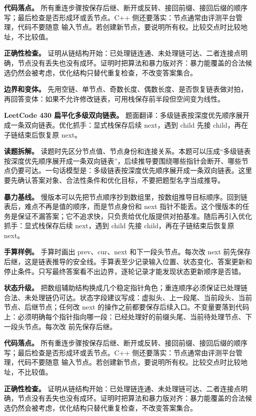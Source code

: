 \textbf{代码落点。} 所有重连步骤按保存后继、断开或反转、接回前缀、接回后缀的顺序写；最后检查是否形成环或丢节点。C++ 侧还要落实：节点通常由评测平台管理，代码不要随意  输入节点。若创建新节点，要说明所有权。比较交点时比较地址，不比较值。

\textbf{正确性检查。} 证明从链结构开始：已处理链连通、未处理链可达、二者连接点明确，节点没有丢失也没有成环。证明时把算法和暴力版对齐：暴力能覆盖的合法候选仍然会被考虑，优化结构只替代重复检查，不改变答案集合。

\textbf{边界和变体。} 先用空链、单节点、奇数长度、偶数长度、是否恢复链表做对拍，再回答变体：如果不允许修改链表，可用栈保存前半段但空间变为线性。

\noindent\textbf{LeetCode 430 扁平化多级双向链表。} 题面翻译：多级链表按深度优先顺序展开成一条双向链表。优化抓手：显式栈保存后续 next，遇到 child 先接 child，再在子链结束后恢复原 next。

\textbf{读题拆解。} 读题时先区分节点值、节点身份和连接关系。本题可以压成“多级链表按深度优先顺序展开成一条双向链表”，后续推导要围绕哪些指针会断开、哪些节点仍要可达。一句话模型是：多级链表按深度优先顺序展开成一条双向链表。这里要先确认答案对象、合法性条件和优化目标，不要把题型名字当成推导。

\textbf{暴力基线。} 慢版本可以先把节点顺序抄到数组里，按数组推导目标顺序。回到链表后，难点不再是值的顺序，而是节点身份和 next 指针不能丢。这个慢版本的任务是保证不漏答案；它不追求快，只负责给优化版提供对拍基准。随后再引入优化抓手：显式栈保存后续 next，遇到 child 先接 child，再在子链结束后恢复原 next。

\textbf{手算样例。} 手算时画出 prev、cur、next 和下一段头节点。每次改 next 前先保存后继，这是链表推导的安全线。手算表至少记录输入位置、状态变化、答案更新和停止条件。只写最终答案看不出边界，逐轮记录才能发现状态更新顺序是否错。

\textbf{状态升级。} 把数组辅助结构换成几个稳定指针角色；重连顺序必须保证已处理链合法、未处理链仍可达。状态字段建议写成：虚拟头、上一段尾、当前段头、当前节点、后继节点；任何改 next 的操作之前都要保存后续入口。不变量要落到代码上：必须明确每个指针指向哪一段：已经处理好的前缀头尾、当前待处理节点、下一段头节点。每次改  前先保存后继。

\textbf{代码落点。} 所有重连步骤按保存后继、断开或反转、接回前缀、接回后缀的顺序写；最后检查是否形成环或丢节点。C++ 侧还要落实：节点通常由评测平台管理，代码不要随意  输入节点。若创建新节点，要说明所有权。比较交点时比较地址，不比较值。

\textbf{正确性检查。} 证明从链结构开始：已处理链连通、未处理链可达、二者连接点明确，节点没有丢失也没有成环。证明时把算法和暴力版对齐：暴力能覆盖的合法候选仍然会被考虑，优化结构只替代重复检查，不改变答案集合。

